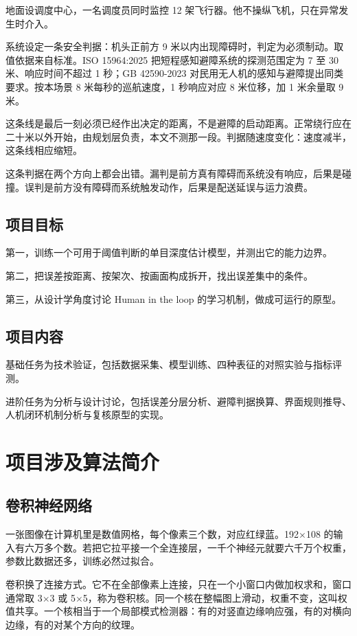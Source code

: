\documentclass[12pt,a4paper]{ctexart}
\begin{document}
地面设调度中心，一名调度员同时监控 12 架飞行器。他不操纵飞机，只在异常发生时介入。

系统设定一条安全判据：机头正前方 9 米以内出现障碍时，判定为必须制动。取值依据来自标准。ISO 15964:2025 把短程感知避障系统的探测范围定为 7 至 30 米、响应时间不超过 1 秒\cite{iso15964}；GB 42590-2023 对民用无人机的感知与避障提出同类要求\cite{gb42590}。按本场景 8 米每秒的巡航速度，1 秒响应对应 8 米位移，加 1 米余量取 9 米。

这条线是最后一刻必须已经作出决定的距离，不是避障的启动距离。正常绕行应在二十米以外开始，由规划层负责，本文不测那一段。判据随速度变化：速度减半，这条线相应缩短。

这条判据在两个方向上都会出错。漏判是前方真有障碍而系统没有响应，后果是碰撞。误判是前方没有障碍而系统触发动作，后果是配送延误与运力浪费。

\subsection{项目目标}

第一，训练一个可用于阈值判断的单目深度估计模型，并测出它的能力边界。

第二，把误差按距离、按架次、按画面构成拆开，找出误差集中的条件。

第三，从设计学角度讨论 Human in the loop 的学习机制，做成可运行的原型。

\subsection{项目内容}

基础任务为技术验证，包括数据采集、模型训练、四种表征的对照实验与指标评测。

进阶任务为分析与设计讨论，包括误差分层分析、避障判据换算、界面规则推导、人机闭环机制分析与复核原型的实现。

\section{项目涉及算法简介}

\subsection{卷积神经网络}

一张图像在计算机里是数值网格，每个像素三个数，对应红绿蓝。192$\times$108 的输入有六万多个数。若把它拉平接一个全连接层，一千个神经元就要六千万个权重，参数比数据还多，训练必然过拟合。

卷积换了连接方式。它不在全部像素上连接，只在一个小窗口内做加权求和，窗口通常取 3$\times$3 或 5$\times$5，称为卷积核。同一个核在整幅图上滑动，权重不变，这叫权值共享。一个核相当于一个局部模式检测器：有的对竖直边缘响应强，有的对横向边缘，有的对某个方向的纹理。
\end{document}
